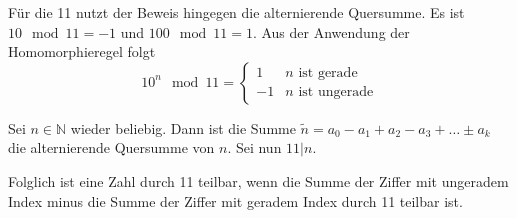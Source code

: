 \documentclass{scrreprt}
\begin{document}
Für die 11 nutzt der Beweis hingegen die alternierende Quersumme.
Es ist $10 \mod 11 = -1$ und $100 \mod 11 = 1$.
Aus der Anwendung der Homomorphieregel folgt
\[
  10^n \mod 11 = \begin{cases}
    1 & n \text{ ist gerade} \\
    -1 & n \text{ ist ungerade}
  \end{cases}
\]


Sei $n \in \mathbb{N}$ wieder beliebig.
Dann ist die Summe $\tilde{n} = a_0 - a_1 + a_2 - a_3 + \ldots \pm a_k$ die
alternierende Quersumme von $n$.
Sei nun $11|n$.

Folglich ist eine Zahl durch 11 teilbar, wenn die Summe der Ziffer mit ungeradem
Index minus die Summe der Ziffer mit geradem Index durch 11 teilbar ist.
\end{document}
